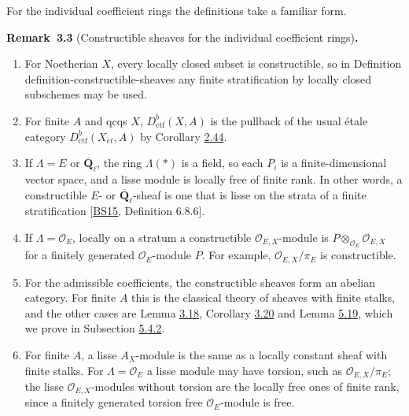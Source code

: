 \documentclass[11pt]{article}
\newenvironment{bpstatement}[2]{\par\addvspace{0.6\baselineskip}\noindent\textbf{#1}#2\textbf{.}\enspace\ignorespaces}
  {\par\addvspace{0.4\baselineskip}}
\begin{document}
\label{bp202}%
For the individual coefficient rings the definitions take a familiar form.

\label{bp203}%
\begin{bpstatement}{Remark~3.3}{ (Constructible sheaves for the individual coefficient rings)}
\begin{enumerate}
\item For Noetherian \(X\), every locally closed subset is constructible, so in Definition definition-constructible-sheaves any finite stratification by locally closed subschemes may be used.
\item For finite \(A\) and qcqs \(X\), \(D^b_{\mathrm{ctf}}(X,A)\) is the pullback of the usual étale category \(D^b_{\mathrm{ctf}}(X_{\acute{e}t},A)\) by Corollary \hyperref[bp132]{2.44}.
\item If \(\Lambda=E\) or \(\overline{\mathbf Q}_\ell\), the ring \(\Lambda(*)\) is a field, so each \(P_i\) is a finite-dimensional vector space, and a lisse module is locally free of finite rank. In other words, a constructible \(E\)- or \(\overline{\mathbf Q}_\ell\)-sheaf is one that is lisse on the strata of a finite stratification [\hyperref[bp705]{BS15}, Definition 6.8.6].
\item If \(\Lambda=\mathcal O_E\), locally on a stratum a constructible \(\mathcal O_{E,X}\)-module is \(P\otimes_{\mathcal O_E}\mathcal O_{E,X}\) for a finitely generated \(\mathcal O_E\)-module \(P\). For example, \(\mathcal O_{E,X}/\pi_E\) is constructible.
\item For the admissible coefficients, the constructible sheaves form an abelian category. For finite \(A\) this is the classical theory of sheaves with finite stalks, and the other cases are Lemma \hyperref[bp248]{3.18}, Corollary \hyperref[bp253]{3.20} and Lemma \hyperref[bp471]{5.19}, which we prove in Subsection \hyperref[bp469]{5.4.2}.
\item For finite \(A\), a lisse \(A_X\)-module is the same as a locally constant sheaf with finite stalks. For \(\Lambda=\mathcal O_E\) a lisse module may have torsion, such as \(\mathcal O_{E,X}/\pi_E\); the lisse \(\mathcal O_{E,X}\)-modules without torsion are the locally free ones of finite rank, since a finitely generated torsion free \(\mathcal O_E\)-module is free.
\end{enumerate}
\end{bpstatement}
\end{document}
